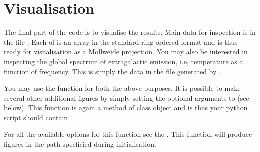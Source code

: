 \documentclass[letterpaper,10pt,english]{sphinxmanual}
\begin{document}
\section{Visualisation}
\label{\detokenize{detexp:visualisation}}
\sphinxAtStartPar
The final part of the code is to visualise the results. Main data for inspection is in the file . Each of  is an array in the standard ring ordered  format and is thus ready for visualisation as a Mollweide projection. You may also be interested in inspecting the global spectrum of extragalactic emission, i.e, temperature as a function of frequency. This is simply the data in the file  generated by .

\sphinxAtStartPar
You may use the function  for both the above purposes. It is possible to make several other additional figures by simply setting the optional arguments to  (see below). This function is again a method of class object {\hyperref[\detokenize{api:furs.furs}]{}} and is thus your python script should contain

\begin{sphinxVerbatim}[commandchars=\\\{\}]
   

  




\end{sphinxVerbatim}

\sphinxAtStartPar
For all the available options for this function see the {\hyperref[\detokenize{api:api}]{}}. This function will produce figures in the path specficied during initialisation.
\end{document}
